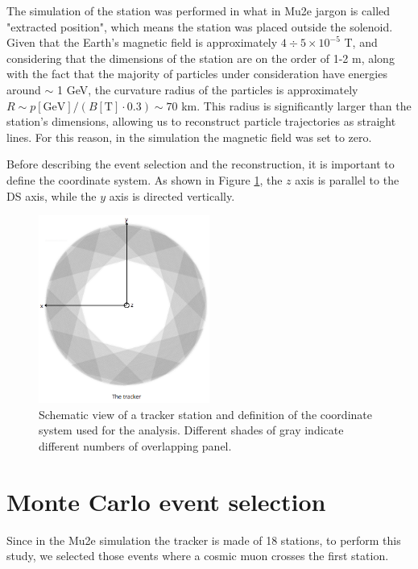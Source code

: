 The simulation of the station was performed in what in Mu2e jargon is called
"extracted position", which means the station was placed outside the solenoid.
Given that the Earth's magnetic field is approximately 
$4 \div 5 \times 10^{-5}$ T, 
and considering that the dimensions of the station are 
on the order of 1-2 m, 
along with the fact that the majority of particles under consideration
have energies around $\sim$ 1 GeV, 
the curvature radius of the particles is approximately 
$R\sim p[\text{GeV}]/(B[\text{T}]\cdot 0.3) \sim 70$ km. 
This radius is significantly larger than the station's 
dimensions, allowing us to reconstruct particle trajectories 
as straight lines.
For this reason, in the simulation  
the magnetic field was set to zero. 

Before describing the event selection and the 
reconstruction, it is important to define the coordinate system. As shown in Figure \ref{fig:coordinate}, 
the $z$ axis is parallel to 
the DS axis, while the $y$ axis is directed vertically.
\begin{figure}[!h]
    \centering
    \includegraphics[width =0.5\textwidth]{figures/png/Screenshot_20240526_164527.png}
    \caption[Schematic view of a tracker station and 
    the coordinate system.]{Schematic view of a tracker station 
    and definition of the coordinate system used for the analysis. 
    Different shades of gray indicate different numbers of overlapping panel.}
    \label{fig:coordinate}
\end{figure}
\section{Monte Carlo event selection}\label{eventselection}

Since in the Mu2e simulation the tracker is made of 18 stations, to 
perform this study, we selected those events where a 
cosmic muon crosses the first station.

